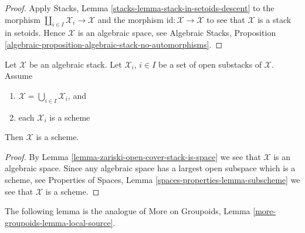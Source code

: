\begin{proof}
Apply
Stacks, Lemma \ref{stacks-lemma-stack-in-setoids-descent}
to the morphism $\coprod_{i \in I} \mathcal{X}_i \to \mathcal{X}$
and the morphism $\text{id} : \mathcal{X} \to \mathcal{X}$ to
see that $\mathcal{X}$ is a stack in setoids.
Hence $\mathcal{X}$ is an algebraic space, see
Algebraic Stacks,
Proposition \ref{algebraic-proposition-algebraic-stack-no-automorphisms}.
\end{proof}

\begin{lemma}
\label{lemma-zariski-open-cover-stack-is-scheme}
Let $\mathcal X$ be an algebraic stack.
Let $\mathcal{X}_i$, $i \in I$ be a set of open substacks of $\mathcal{X}$.
Assume
\begin{enumerate}
\item $\mathcal{X} = \bigcup_{i \in I} \mathcal{X}_i$, and
\item each $\mathcal{X}_i$ is a scheme
\end{enumerate}
Then $\mathcal{X}$ is a scheme.
\end{lemma}

\begin{proof}
By
Lemma \ref{lemma-zariski-open-cover-stack-is-space}
we see that $\mathcal{X}$ is an algebraic space. Since any algebraic
space has a largest open subspace which is a scheme, see
Properties of Spaces, Lemma \ref{spaces-properties-lemma-subscheme}
we see that $\mathcal{X}$ is a scheme.
\end{proof}


\noindent
The following lemma is the analogue of
More on Groupoids, Lemma \ref{more-groupoids-lemma-local-source}.

